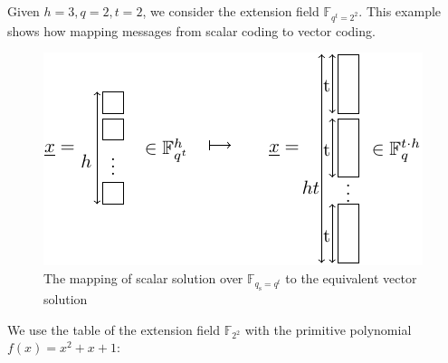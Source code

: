 \begin{example}
\label{ex:scalar_vector_mapping} 

Given $h=3,q=2,t=2$, we consider the extension field $\ensuremath{\mathbb{F}}_{q^{t}=2^{2}}$.
This example shows how mapping messages from scalar coding to vector
coding.
\begin{figure}[H]
\caption{The mapping of scalar solution over $\ensuremath{\mathbb{F}}_{q_{\mathrm{s}}=q^{t}}$
to the equivalent vector solution\label{fig:x_mapping}}

\centering{}\includegraphics[width=0.3\paperwidth]{./figures/x_mapping}
\end{figure}
\end{example}
We use the table of the extension field $\ensuremath{\mathbb{F}}_{2^{2}}$
with the primitive polynomial $f(x)=x^{2}+x+1$:
